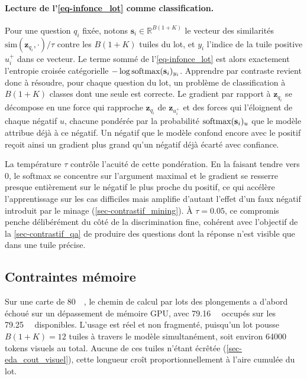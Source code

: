 \paragraph{Lecture de l'\cref{eq-infonce_lot} comme classification.} Pour une
question $q_i$ fixée, notons $\mathbf{s}_i \in \mathbb{R}^{B(1+K)}$ le vecteur
des similarités $\mathrm{sim}(\mathbf{z}_{q_i}, \cdot)/\tau$ contre les $B(1+K)$
tuiles du lot, et $y_i$ l'indice de la tuile positive $u_i^+$ dans ce vecteur. Le
terme sommé de l'\cref{eq-infonce_lot} est alors exactement l'entropie croisée
catégorielle $-\log \operatorname{\text{\normalfont softmax}}(\mathbf{s}_i)_{y_i}$. Apprendre par contraste
revient donc à résoudre, pour chaque question du lot, un problème de
classification à $B(1+K)$ classes dont une seule est correcte. Le gradient par
rapport à $\mathbf{z}_{q_i}$ se décompose en une force qui rapproche
$\mathbf{z}_{q_i}$ de $\mathbf{z}_{u_i^+}$ et des forces qui l'éloignent de
chaque négatif $u$, chacune pondérée par la probabilité
$\operatorname{\text{\normalfont softmax}}(\mathbf{s}_i)_u$ que le modèle attribue déjà à ce négatif. Un
négatif que le modèle confond encore avec le positif reçoit ainsi un gradient
plus grand qu'un négatif déjà écarté avec confiance.
 
La température $\tau$ contrôle l'acuité de cette pondération. En la faisant
tendre vers $0$, le softmax se concentre sur l'argument maximal et le gradient
se resserre presque entièrement sur le négatif le plus proche du positif, ce qui
accélère l'apprentissage sur les cas difficiles mais amplifie d'autant l'effet
d'un faux négatif introduit par le minage (\cref{sec-contrastif_mining}). À
$\tau = \num{0.05}$, ce compromis penche délibérément du côté de la
discrimination fine, cohérent avec l'objectif de la \cref{sec-contrastif_qa} de
produire des questions dont la réponse n'est visible que dans une tuile précise.
 
\subsection{Contraintes mémoire}
\label{sec-contrastif_memoire}
 
Sur une carte de \SI{80}{\giga\byte}, le chemin de calcul par lots des
plongements a d'abord échoué sur un dépassement de mémoire GPU, avec
\SI{79.16}{\giga\byte} occupés sur les \SI{79.25}{\giga\byte} disponibles.
L'usage est réel et non fragmenté, puisqu'un lot pousse $B(1+K) = 12$ tuiles à
travers le modèle simultanément, soit environ \num{64 000} tokens
visuels au total. Aucune de ces tuiles n'étant écrêtée
(\cref{sec-eda_cout_visuel}), cette longueur croît proportionnellement à l'aire
cumulée du lot.
 
